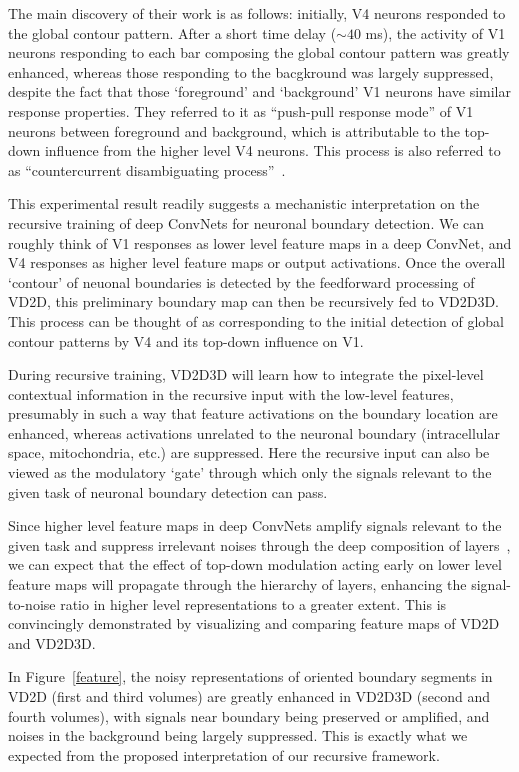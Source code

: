 \documentclass{article} %
\begin{document}
The main discovery of their work is as follows: initially, V4 neurons responded to the global contour pattern. After a short time delay (${\sim}40$ ms), the activity of V1 neurons responding to each bar composing the global contour pattern was greatly enhanced, whereas those responding to the bacgkround was largely suppressed, despite the fact that those `foreground' and `background' V1 neurons have similar response properties. They referred to it as ``push-pull response mode'' of V1 neurons between foreground and background, which is attributable to the top-down influence from the higher level V4 neurons.
This process is also referred to as ``countercurrent disambiguating process''~\cite{Chen2014}.

This experimental result readily suggests a mechanistic interpretation on the recursive training of deep ConvNets for neuronal boundary detection. We can roughly think of V1 responses as lower level feature maps in a deep ConvNet, and V4 responses as higher level feature maps or output activations. Once the overall `contour' of neuonal boundaries is detected by the feedforward processing of VD2D, this preliminary boundary map can then be recursively fed to VD2D3D. This process can be thought of as corresponding to the initial detection of global contour patterns by V4 and its top-down influence on V1.

During recursive training, VD2D3D will learn how to integrate the pixel-level contextual information in the recursive input with the low-level features, presumably in such a way that feature activations on the boundary location are enhanced, whereas activations unrelated to the neuronal boundary (intracellular space, mitochondria, etc.) are suppressed. Here the recursive input can also be viewed as the modulatory `gate' through which only the signals relevant to the given task of neuronal boundary detection can pass.

Since higher level feature maps in deep ConvNets amplify signals relevant to the given task and suppress irrelevant noises through the deep composition of layers~\cite{LeCun2015}, we can expect that the effect of top-down modulation acting early on lower level feature maps will propagate through the hierarchy of layers, enhancing the signal-to-noise ratio in higher level representations to a greater extent. This is convincingly demonstrated by visualizing and comparing feature maps of VD2D and VD2D3D.

In Figure~\ref{feature},
the noisy representations of oriented boundary segments in VD2D (first and third volumes) are greatly enhanced in VD2D3D (second and fourth volumes), with signals near boundary being preserved or amplified, and noises in the background being largely suppressed. This is exactly what we expected from the proposed interpretation of our recursive framework.
\end{document}
